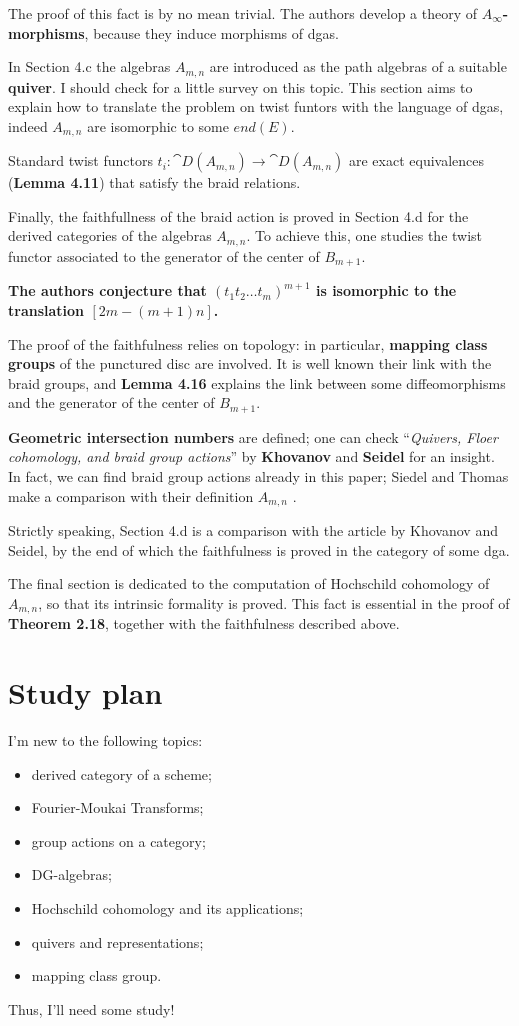 The proof of this fact is by no mean trivial.
The authors develop a theory of \textbf{$A_{\infty}$-morphisms},
because they induce morphisms of dgas.

In Section 4.c the algebras $A_{m,n}$ are introduced
as the path algebras of a suitable \textbf{quiver}.
I should check for a little survey on this topic.
This section aims to explain how to translate the
problem on twist funtors with the language of 
dgas, indeed $A_{m,n}$ are isomorphic
to some $end(E)$.

Standard twist functors $t_{i}:\cat{D}(A_{m,n}) \to \cat{D}(A_{m,n})$
are exact equivalences (\textbf{Lemma 4.11}) that
satisfy the braid relations.

Finally, the faithfullness of the braid action
is proved in Section 4.d 
for the derived categories of the algebras $A_{m,n}$.
To achieve this, one studies the twist functor
associated to the generator of the center of $B_{m+1}$.

\textbf{The authors conjecture that $(t_{1}t_{2} \dots t_{m})^{m+1}$
is isomorphic to the translation $[2m-(m+1)n]$.}

The proof of the faithfulness relies on topology:
in particular, \textbf{mapping class groups} 
of the punctured disc are involved. It is well known
their link with the braid groups,
and \textbf{Lemma 4.16} explains the link
between some diffeomorphisms
and the generator of the center of $B_{m+1}$.


\textbf{Geometric intersection numbers}
are defined; one can check
``\emph{Quivers, Floer cohomology, and braid group actions}''
by \textbf{Khovanov} and \textbf{Seidel}
for an insight. 
In fact, we can find braid group actions 
already in this paper;
Siedel and Thomas make a comparison
with their definition $A_{m,n}$ .

Strictly speaking, Section 4.d is a comparison
with the article by Khovanov and Seidel,
by the end of which the faithfulness
is proved in the category of some dga.

The final section is dedicated
to the computation of Hochschild cohomology
of $A_{m,n}$, so that its intrinsic formality is proved.
This fact is essential in the proof of \textbf{Theorem 2.18},
together with the faithfulness described above.


\section{Study plan}

	I'm new to the following topics:
	\begin{itemize}
		\item derived category of a scheme;
		\item Fourier-Moukai Transforms;
		\item group actions on a category;
		\item DG-algebras;
		\item Hochschild cohomology and its applications;
		\item quivers and representations;
		\item mapping class group.
	\end{itemize}
	Thus, I'll need some study!
	
